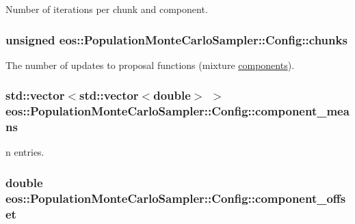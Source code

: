 Number of iterations per chunk and component. \hypertarget{structeos_1_1PopulationMonteCarloSampler_1_1Config_a14c4bdc8c63ca8115e326e4c7bb3116e}{
\subsubsection[{chunks}]{\setlength{\rightskip}{0pt plus 5cm}unsigned {\bf eos::PopulationMonteCarloSampler::Config::chunks}}}
\label{structeos_1_1PopulationMonteCarloSampler_1_1Config_a14c4bdc8c63ca8115e326e4c7bb3116e}


The number of updates to proposal functions (mixture \hyperlink{namespaceeos_1_1components}{components}). \hypertarget{structeos_1_1PopulationMonteCarloSampler_1_1Config_a5668b999c1f4c6517b9366035571143d}{
\subsubsection[{component\_\-means}]{\setlength{\rightskip}{0pt plus 5cm}std::vector$<$std::vector$<$double$>$ $>$ {\bf eos::PopulationMonteCarloSampler::Config::component\_\-means}}}
\label{structeos_1_1PopulationMonteCarloSampler_1_1Config_a5668b999c1f4c6517b9366035571143d}


n entries. \hypertarget{structeos_1_1PopulationMonteCarloSampler_1_1Config_a91b615db28333d345eae6d8a2ef55fd5}{
\subsubsection[{component\_\-offset}]{\setlength{\rightskip}{0pt plus 5cm}double {\bf eos::PopulationMonteCarloSampler::Config::component\_\-offset}}}
\label{structeos_1_1PopulationMonteCarloSampler_1_1Config_a91b615db28333d345eae6d8a2ef55fd5}


